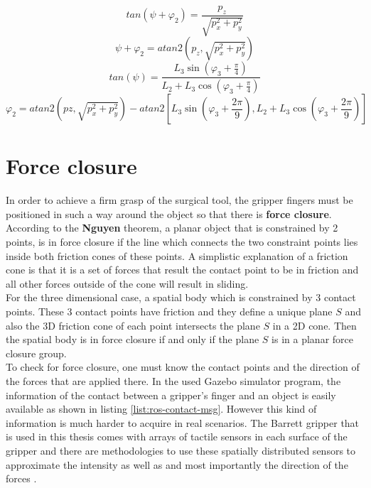 \begin{equation}
tan \left( ψ + φ_2 \right) = \frac{p_z}{\sqrt{p_x^2 + p_y^2}}
\end{equation}
\begin{equation}
ψ + φ_2 = atan2 \left( p_z, \sqrt{p_x^2 + p_y^2} \right)
\end{equation}
\begin{equation}
tan \left( ψ \right) = \frac{L_3 \sin \left( φ_3 + \frac{π}{4} \right) }{L_2 + L_3 \cos \left( φ_3 + \frac{π}{4} \right)}
\end{equation}
\small
\begin{equation}
φ_2 = atan2 \left( pz, \sqrt{p_x^2 + p_y^2} \right) - atan2 \left[ L_3 \sin \left( φ_3 + \frac{2π}{9} \right), L_2 + L_3 \cos \left( φ_3 + \frac{2π}{9} \right) \right]
\end{equation}
\normalsize

\section{Force closure}

In order to achieve a firm grasp of the surgical tool, the gripper fingers must be positioned in such a way around the object so that there is \textbf{force closure}. According to the \textbf{Nguyen} theorem, a planar 
object that is constrained by 2 points, is in force closure if the line which connects the two constraint points lies inside both friction cones of these points. A simplistic explanation of a friction cone is 
that it is a set of forces that result the contact point to be in friction and all other forces outside of the cone will result in sliding. \\

For the three dimensional case, a spatial body which is constrained by 3 contact points. These 3 contact points have friction and they define a unique plane $S$ and also the 3D friction cone of each point 
intersects the plane $S$ in a 2D cone. Then the spatial body is in force closure if and only if the plane $S$ is in a planar force closure group.\\

To check for force closure, one must know the contact points and the direction of the forces that are applied there. In the used Gazebo simulator program, the information of the contact between a gripper's finger and an object is easily available as shown in listing \ref{list:ros-contact-msg}. However this kind of information is much harder to acquire in real scenarios. The Barrett gripper that is used in this thesis comes with arrays of tactile sensors in each surface of the gripper and there are methodologies to use these spatially distributed sensors to approximate the intensity as well as and most importantly the direction of the forces \cite{tactile-sensors-force}.

